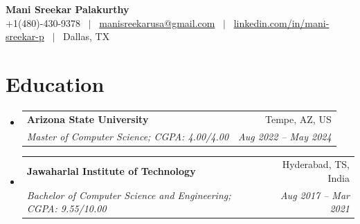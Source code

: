 \documentclass[a4paper,10pt]{article}
\makeatletter
\newcommand{\resumeEduHeading}[4]{
  \vspace{-1pt}\item
    \begin{tabular*}{\linewidth}{l@{\extracolsep{\fill}}r}
      \textbf{#1} & #2 \\
      \textit{#3} & \textit{#4} \\
    \end{tabular*}\vspace{-5pt}
}
\newcommand{\resumeSubHeadingListStart}{\begin{itemize}[leftmargin=0pt, label={}, itemsep=0pt]}
\newcommand{\resumeSubHeadingListEnd}{\end{itemize}}
\makeatother
\begin{document}
\begin{center}
  {\LARGE \textbf{Mani Sreekar Palakurthy}} \\[4pt]
  {\small +1(480)-430-9378 \, $|$ \, \href{mailto:manisreekarusa@gmail.com}{manisreekarusa@gmail.com} \, $|$ \, \href{https://www.linkedin.com/in/mani-sreekar-p/}{linkedin.com/in/mani-sreekar-p} \, $|$ \, Dallas, TX}
\end{center}

\vspace{-4pt}


\vspace{3pt}

\vspace{3pt}

\vspace{3pt}
\section{Education}
\resumeSubHeadingListStart
    \resumeEduHeading
      {Arizona State University}{Tempe, AZ, US}
      {Master of Computer Science; CGPA: 4.00/4.00}{Aug 2022 -- May 2024}
      \vspace{3pt}
    \resumeEduHeading
      {Jawaharlal Institute of Technology}{Hyderabad, TS, India}
      {Bachelor of Computer Science and Engineering; CGPA: 9.55/10.00}{Aug 2017 -- Mar 2021}
\resumeSubHeadingListEnd

\vspace{3pt}
\end{document}

